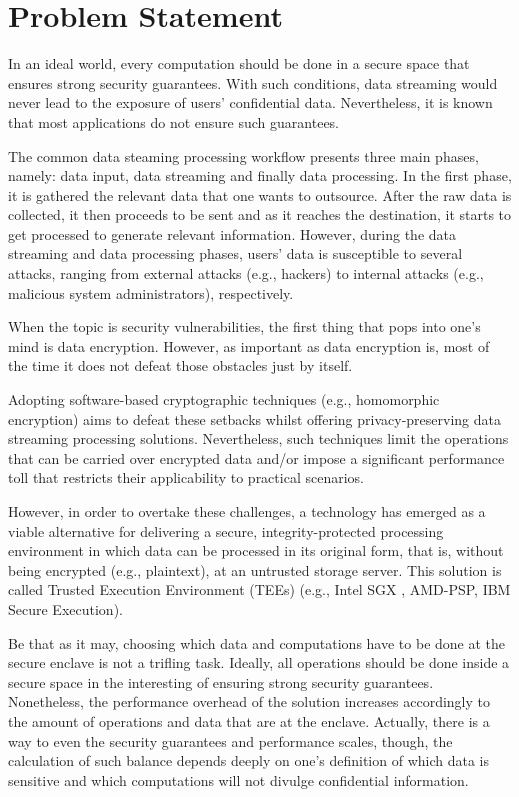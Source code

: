 
\section{Problem Statement}\label{s:problem}
In an ideal world, every computation should be done in a secure space that ensures strong security guarantees. With such conditions, data streaming would never lead to the exposure of users' confidential data. Nevertheless, it is known that most applications do not ensure such guarantees. 

The common data steaming processing workflow presents three main phases, namely: data input, data streaming and finally data processing. In the first phase, it is gathered the relevant data that one wants to outsource. After the raw data is collected, it then proceeds to be sent and as it reaches the destination, it starts to get processed to generate relevant information. However, during the data streaming and data processing phases, users’ data is susceptible to several attacks, ranging from external attacks (e.g., hackers) to internal attacks (e.g., malicious system administrators), respectively.

When the topic is security vulnerabilities, the first thing that pops into one's mind is data encryption. However, as important as data encryption is, most of the time it does not defeat those obstacles just by itself.

Adopting software-based cryptographic techniques (e.g., homomorphic encryption) aims to defeat these setbacks whilst offering privacy-preserving data streaming processing solutions. Nevertheless, such techniques limit the operations that can be carried over encrypted data and/or impose a significant performance toll that restricts their applicability to practical scenarios. \cite{soteria}

However, in order to overtake these challenges, a technology has emerged as a viable alternative for delivering a secure, integrity-protected processing environment in which data can be processed in its original form, that is, without being encrypted (e.g., plaintext), at an untrusted storage server.\cite{7345265} This solution is called Trusted Execution Environment (TEEs) (e.g., Intel SGX \cite{sgxdocs, intelsgxexplained}, AMD-PSP, IBM Secure Execution).

Be that as it may, choosing which data and computations have to be done at the secure enclave is not a trifling task. Ideally, all operations should be done inside a secure space in the interesting of ensuring strong security guarantees. Nonetheless, the performance overhead of the solution increases accordingly to the amount of operations and data that are at the enclave. Actually, there is a way to even the security guarantees and performance scales, though, the calculation of such balance depends deeply on one's definition of which data is sensitive and which computations will not divulge confidential information.

